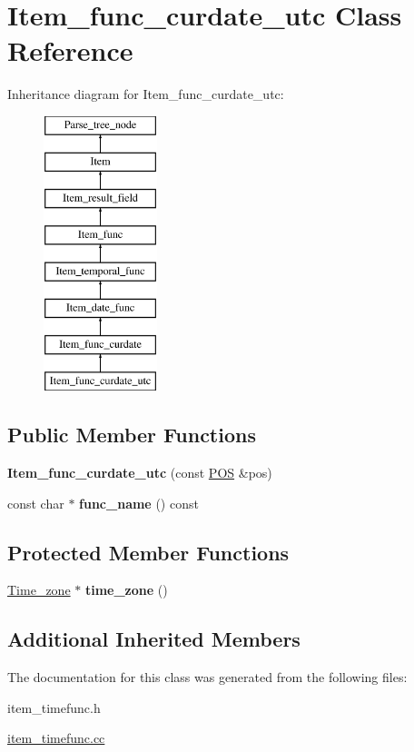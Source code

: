 \hypertarget{classItem__func__curdate__utc}{}\section{Item\+\_\+func\+\_\+curdate\+\_\+utc Class Reference}
\label{classItem__func__curdate__utc}
Inheritance diagram for Item\+\_\+func\+\_\+curdate\+\_\+utc\+:\begin{figure}[H]
\begin{center}
\leavevmode
\includegraphics[height=8.000000cm]{classItem__func__curdate__utc}
\end{center}
\end{figure}
\subsection*{Public Member Functions}
\begin{DoxyCompactItemize}
\item 
\mbox{\label{classItem__func__curdate__utc_adfd1ddb8a0df32e57cf9c90ab938c1b7}} 
{\bfseries Item\+\_\+func\+\_\+curdate\+\_\+utc} (const \mbox{\hyperlink{structYYLTYPE}{P\+OS}} \&pos)
\item 
\mbox{\label{classItem__func__curdate__utc_a986779063ad8b94e2369cdf9831a71dc}} 
const char $\ast$ {\bfseries func\+\_\+name} () const
\end{DoxyCompactItemize}
\subsection*{Protected Member Functions}
\begin{DoxyCompactItemize}
\item 
\mbox{\label{classItem__func__curdate__utc_a650a121d3805242e5ec262de163c20dc}} 
\mbox{\hyperlink{classTime__zone}{Time\+\_\+zone}} $\ast$ {\bfseries time\+\_\+zone} ()
\end{DoxyCompactItemize}
\subsection*{Additional Inherited Members}


The documentation for this class was generated from the following files\+:\begin{DoxyCompactItemize}
\item 
item\+\_\+timefunc.\+h\item 
\mbox{\hyperlink{item__timefunc_8cc}{item\+\_\+timefunc.\+cc}}\end{DoxyCompactItemize}
